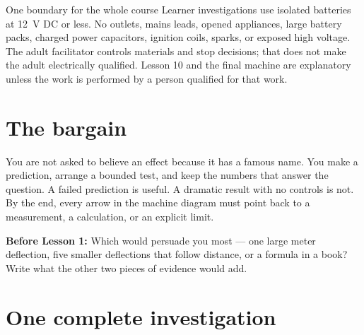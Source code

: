 


\newcommand{\evidencearrow}{\tikz[baseline=-.25ex]\draw[-{Stealth[length=1.7mm]},line width=.6pt](0,0)--(.55,0);}
\newcommand{\ruledline}{\rule{.96\linewidth}{.3pt}}



\begin{teloshazard}{One boundary for the whole course}
Learner investigations use isolated batteries at \qty{12}{V} DC or less.
No outlets, mains leads, opened appliances, large battery packs, charged power
capacitors, ignition coils, sparks, or exposed high voltage. The adult
facilitator controls materials and stop decisions; that does not make the adult
electrically qualified. Lesson 10 and the final machine are explanatory unless
the work is performed by a person qualified for that work.
\end{teloshazard}

\section{The bargain}
You are not asked to believe an effect because it has a famous name. You make a
prediction, arrange a bounded test, and keep the numbers that answer the
question. A failed prediction is useful. A dramatic result with no controls is
not. By the end, every arrow in the machine diagram must point back to a
measurement, a calculation, or an explicit limit.

\begin{predict}
\textbf{Before Lesson 1:} Which would persuade you most --- one large meter
deflection, five smaller deflections that follow distance, or a formula in a
book? Write what the other two pieces of evidence would add.
\end{predict}

\section{One complete investigation}
\begin{center}
\end{center}

